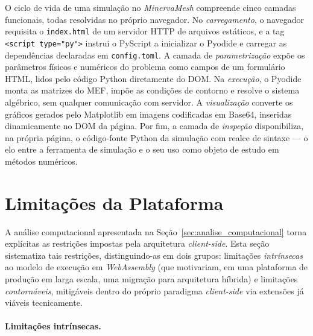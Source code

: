 O ciclo de vida de uma simulação no \textit{MinervaMesh} compreende cinco camadas funcionais, todas resolvidas no próprio navegador. No \emph{carregamento}, o navegador requisita o \texttt{index.html} de um servidor HTTP de arquivos estáticos, e a tag \texttt{<script type="py">} instrui o PyScript a inicializar o Pyodide e carregar as dependências declaradas em \texttt{config.toml}. A camada de \emph{parametrização} expõe os parâmetros físicos e numéricos do problema como campos de um formulário HTML, lidos pelo código Python diretamente do DOM. Na \emph{execução}, o Pyodide monta as matrizes do MEF, impõe as condições de contorno e resolve o sistema algébrico, sem qualquer comunicação com servidor. A \emph{visualização} converte os gráficos gerados pelo Matplotlib em imagens codificadas em Base64, inseridas dinamicamente no DOM da página. Por fim, a camada de \emph{inspeção} disponibiliza, na própria página, o código-fonte Python da simulação com realce de sintaxe --- o elo entre a ferramenta de simulação e o seu uso como objeto de estudo em métodos numéricos.

\section{Limitações da Plataforma}
\label{sec:limitacoes}

A análise computacional apresentada na Seção~\ref{sec:analise_computacional} torna explícitas as restrições impostas pela arquitetura \textit{client-side}. Esta seção sistematiza tais restrições, distinguindo-as em dois grupos: limitações \textit{intrínsecas} ao modelo de execução em \textit{WebAssembly} (que motivariam, em uma plataforma de produção em larga escala, uma migração para arquitetura híbrida) e limitações \textit{contornáveis}, mitigáveis dentro do próprio paradigma \textit{client-side} via extensões já viáveis tecnicamente.

\paragraph{Limitações intrínsecas.}

